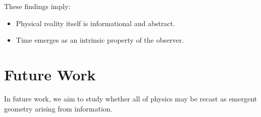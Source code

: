 \documentclass[11pt]{article}
\begin{document}
These findings imply:

\begin{itemize}
\item Physical reality itself is informational and abstract.
\item Time emerges as an intrinsic property of the observer.
\end{itemize}


\section*{Future Work}


In future work, we aim to study whether all of physics may be recast as emergent geometry arising from information.
\end{document}
